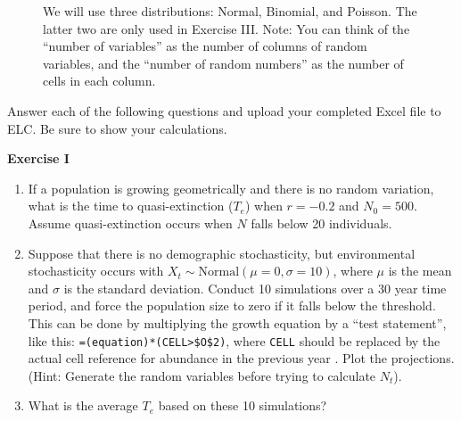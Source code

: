 \documentclass[12pt]{article}\usepackage[]{graphicx}\usepackage[]{color}
\begin{document}
\vspace{1cm}

\begin{figure}[h]
  \centering
  \caption{\footnotesize We will use three distributions: Normal,
    Binomial, and Poisson. The latter two are only used in Exercise
    III. Note: You can think of the ``number of variables'' as the
    number of columns of random variables, and the ``number of random
    numbers'' as the number of cells in each column.}
  \label{fig:rng-3}
\end{figure}


\clearpage

Answer each of the following questions and upload your completed Excel
file to ELC. Be sure to show your calculations. \\

\vspace{12pt}

{\bf Exercise I \\}
\begin{enumerate}
  \item If a population is growing geometrically and there is no
    random variation, what is the time to quasi-extinction ($T_e$) when
    $r=-0.2$ and $N_0=500$. Assume quasi-extinction occurs when $N$ falls
    below 20 individuals.
  \item Suppose that there is no demographic stochasticity,
    but environmental stochasticity occurs with $X_t \sim
    \mathrm{Normal}(\mu=0, \sigma=10)$, where $\mu$ is the mean
    and $\sigma$ is the standard deviation. Conduct 10 simulations over a
    30 year time period, and force the population size to zero if it
    falls below the threshold. This can be done by multiplying the
    growth equation by a ``test statement'', like this:
    \verb+=(equation)*(CELL>$O$2)+, where \verb+CELL+ should be
    replaced by the actual cell reference for abundance in the
    previous year . Plot the projections. (Hint: Generate the 
    random variables before trying to calculate $N_t$).
  \item What is the average $T_e$ based on these 10 simulations?
\end{enumerate}
\end{document}

